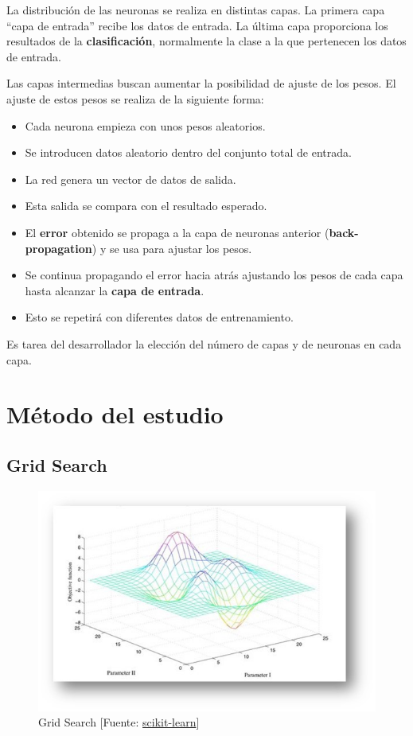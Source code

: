 	La distribución de las neuronas se realiza en distintas capas. La primera capa ``capa de entrada'' recibe los datos de entrada. La última capa proporciona los resultados de la \textbf{clasificación}, normalmente la clase a la que pertenecen los datos de entrada.

	Las capas intermedias buscan aumentar la posibilidad de ajuste de los pesos. El ajuste de estos pesos se realiza de la siguiente forma:

	\begin{itemize}
		\item Cada neurona empieza con unos pesos aleatorios.
		\item Se introducen datos aleatorio dentro del conjunto total de entrada.
		\item La red genera un vector de datos de salida.
		\item Esta salida se compara con el resultado esperado.
		\item El \textbf{error} obtenido se propaga a la capa de neuronas anterior (\textbf{back-propagation}) y se usa para ajustar los pesos.
		\item Se continua propagando el error hacia atrás ajustando los pesos de cada capa hasta alcanzar la \textbf{capa de entrada}.
		\item Esto se repetirá con diferentes datos de entrenamiento.
 	\end{itemize}

	Es tarea del desarrollador la elección del número de capas y de neuronas en cada capa.

\section{Método del estudio}
\label{makereference4.4}
	\subsection{Grid Search}

	\begin{figure}[htb]
		\begin{center}
			\includegraphics[width=4.5in]{figures/grid_search.jpeg}
			\caption{Grid Search [Fuente: \href{www.scikit-learn.org}{scikit-learn}]}
		\end{center}
		\label{grid}
	\end{figure}

